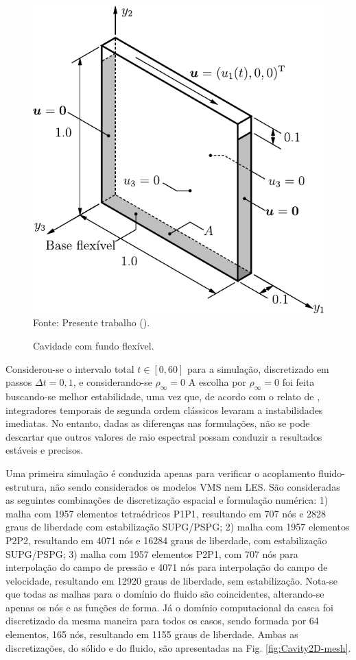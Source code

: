 \begin{figure}[h!]
    \centering
    \caption{Cavidade com fundo flexível.}
    \includegraphics[width=0.5\linewidth]{Figuras/FSI-Cavity2D/FSI-Cavity2D.pdf}
    \\Fonte: Presente trabalho (\the\year).
    \label{fig:cavity2D}
\end{figure}

Considerou-se o intervalo total $t\in[0,60]$ para a simulação, discretizado em passos $\Delta t=0,1$, e considerando-se $\rho_\infty=0$ A escolha por $\rho_\infty=0$ foi feita buscando-se melhor estabilidade, uma vez que, de acordo com o relato de , integradores temporais de segunda ordem clássicos levaram a instabilidades imediatas. No entanto, dadas as diferenças nas formulações, não se pode descartar que outros valores de raio espectral possam conduzir a resultados estáveis e precisos.

Uma primeira simulação é conduzida apenas para verificar o acoplamento fluido-estrutura, não sendo considerados os modelos VMS nem LES. São consideradas as seguintes combinações de discretização espacial e formulação numérica: 1) malha com 1957 elementos tetraédricos P1P1, resultando em 707 nós e 2828 graus de liberdade com estabilização SUPG/PSPG; 2) malha com 1957 elementos P2P2, resultando em 4071 nós e 16284 graus de liberdade, com estabilização SUPG/PSPG; 3) malha com 1957 elementos P2P1, com 707 nós para interpolação do campo de pressão e 4071 nós para interpolação do campo de velocidade, resultando em 12920 graus de liberdade, sem estabilização. Nota-se que todas as malhas para o domínio do fluido são coincidentes, alterando-se apenas os nós e as funções de forma. Já o domínio computacional da casca foi discretizado da mesma maneira para todos os casos, sendo formada por 64 elementos, 165 nós, resultando em 1155 graus de liberdade. Ambas as discretizações, do sólido e do fluido, são apresentadas na Fig. \ref{fig:Cavity2D-mesh}.

